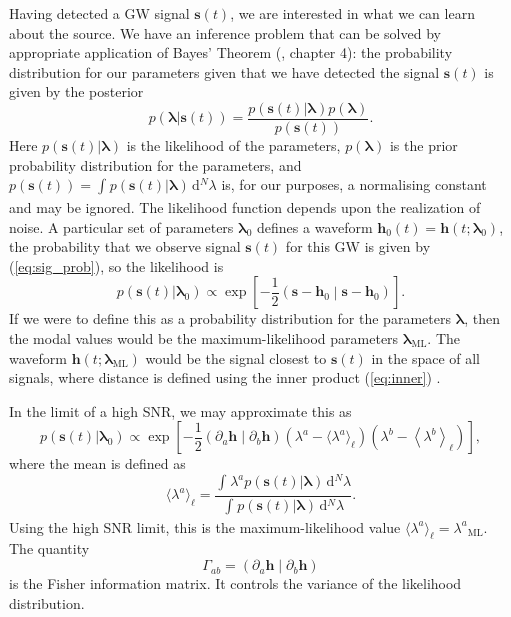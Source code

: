 \documentclass[useAMS,usedcolumn,usegraphicx,usenatbib]{mn2e}
\newcommand{\eqnref}[1]{(\ref{eq:#1})}
\newcommand{\sub}[1]{\ensuremath{_\mathrm{#1}}}
\newcommand{\dd}{\ensuremath{\mathrm{d}}}
\newcommand{\intd}[4]{\ensuremath{\int_{#1}^{#2}{#3}\,\dd{#4}}}
\newcommand{\recip}[1]{\ensuremath{\frac{1}{#1}}}
\newcommand{\innerprod}[2]{\ensuremath{\left({#1}\middle|{#2}\right)}}
\begin{document}
Having detected a GW signal $\boldsymbol{s}(t)$, we are interested in what we can learn about the source. We have an inference problem that can be solved by appropriate application of Bayes' Theorem (\citealt{Jaynes2003}, chapter 4): the probability distribution for our parameters given that we have detected the signal $\boldsymbol{s}(t)$ is given by the posterior
\begin{equation}
p(\boldsymbol{\lambda}|\boldsymbol{s}(t)) = \frac{p(\boldsymbol{s}(t)|\boldsymbol{\lambda})p(\boldsymbol{\lambda})}{p(\boldsymbol{s}(t))}.
\end{equation}
Here $p(\boldsymbol{s}(t)|\boldsymbol{\lambda})$ is the likelihood of the parameters, $p(\boldsymbol{\lambda})$ is the prior probability distribution for the parameters, and $p(\boldsymbol{s}(t)) = \intd{}{}{p(\boldsymbol{s}(t)|\boldsymbol{\lambda})}{^N \lambda}$ is, for our purposes, a normalising constant and may be ignored. The likelihood function depends upon the realization of noise. A particular set of parameters $\boldsymbol{\lambda}_0$ defines a waveform $\boldsymbol{h}_0(t) = \boldsymbol{h}(t; \boldsymbol{\lambda}_0)$, the probability that we observe signal $\boldsymbol{s}(t)$ for this GW is given by \eqnref{sig_prob}, so the likelihood is
\begin{equation}
p(\boldsymbol{s}(t)|\boldsymbol{\lambda}_0) \propto \exp\left[-\recip{2}\innerprod{\boldsymbol{s}-\boldsymbol{h}_0}{\boldsymbol{s}-\boldsymbol{h}_0}\right].
\end{equation}
If we were to define this as a probability distribution for the parameters $\boldsymbol{\lambda}$, then the modal values would be the maximum-likelihood parameters $\boldsymbol{\lambda}\sub{ML}$. The waveform $\boldsymbol{h}(t; \boldsymbol{\lambda}\sub{ML})$ would be the signal closest to $\boldsymbol{s}(t)$ in the space of all signals, where distance is defined using the inner product \eqnref{inner} \citep{Cutler1994}.

In the limit of a high SNR, we may approximate this as \citep{Vallisneri2008}
\begin{equation}
p(\boldsymbol{s}(t)|\boldsymbol{\lambda}_0) \propto \exp\left[-\recip{2}\innerprod{\partial_a\boldsymbol{h}}{\partial_b\boldsymbol{h}}\left(\lambda^a - \langle\lambda^a\rangle_\ell\right)\left(\lambda^b - \left\langle\lambda^b\right\rangle_\ell\right)\right],
\end{equation}
where the mean is defined as
\begin{equation}
\langle\lambda^a\rangle_\ell = \frac{\intd{}{}{\lambda^a p(\boldsymbol{s}(t)|\boldsymbol{\lambda})}{^N \lambda}}{\intd{}{}{p(\boldsymbol{s}(t)|\boldsymbol{\lambda})}{^N \lambda}}.
\end{equation}
Using the high SNR limit, this is the maximum-likelihood value $\langle\lambda^a\rangle_\ell = \lambda^a\sub{ML}$. The quantity
\begin{equation}
\Gamma_{ab} = \innerprod{\partial_a\boldsymbol{h}}{\partial_b\boldsymbol{h}}
\label{eq:Fisher}
\end{equation}
is the Fisher information matrix. It controls the variance of the likelihood distribution.
\end{document}
